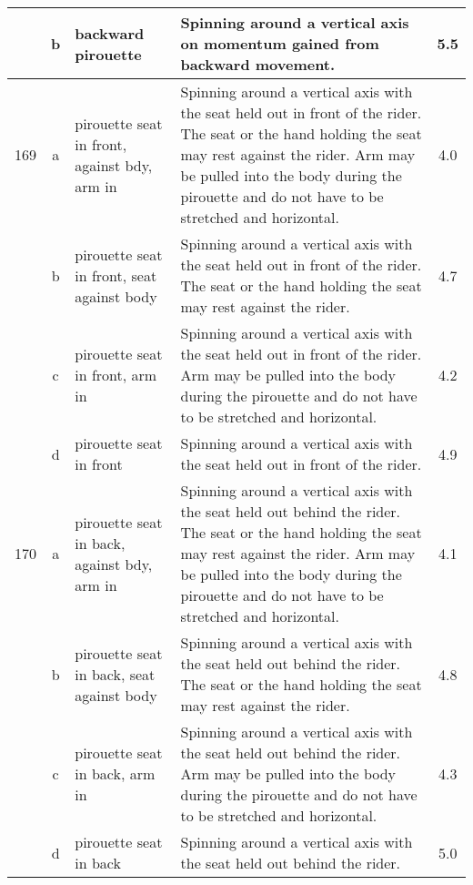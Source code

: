 \begin{longtable}{|r|c|p{4cm}|p{8cm}|c|}
\hline
  & b & backward pirouette  & Spinning around a vertical axis on momentum gained from backward movement.  & 5.5 \\ 
\hline
169 & a & pirouette seat in front, against bdy, arm in  & Spinning around a vertical axis with the seat held out in front of the rider. The seat or the hand holding the seat may rest against the rider. Arm may be pulled into the body during the pirouette and do not have to be stretched and horizontal.  & 4.0 \\ 
\hline
  & b & pirouette seat in front, seat against body  & Spinning around a vertical axis with the seat held out in front of the rider. The seat or the hand holding the seat may rest against the rider. & 4.7 \\ 
\hline
  & c & pirouette seat in front, arm in & Spinning around a vertical axis with the seat held out in front of the rider. Arm may be pulled into the body during the pirouette and do not have to be stretched and horizontal.  & 4.2 \\ 
\hline
  & d & pirouette seat in front & Spinning around a vertical axis with the seat held out in front of the rider. & 4.9 \\ 
\hline
170 & a & pirouette seat in back, against bdy, arm in & Spinning around a vertical axis with the seat held out behind the rider. The seat or the hand holding the seat may rest against the rider. Arm may be pulled into the body during the pirouette and do not have to be stretched and horizontal. & 4.1 \\ 
\hline
  & b & pirouette seat in back, seat against body & Spinning around a vertical axis with the seat held out behind the rider. The seat or the hand holding the seat may rest against the rider.  & 4.8 \\ 
\hline
  & c & pirouette seat in back, arm in  & Spinning around a vertical axis with the seat held out behind the rider. Arm may be pulled into the body during the pirouette and do not have to be stretched and horizontal. & 4.3 \\ 
\hline
  & d & pirouette seat in back  & Spinning around a vertical axis with the seat held out behind the rider.  & 5.0 \\ 
\hline
\end{longtable}

